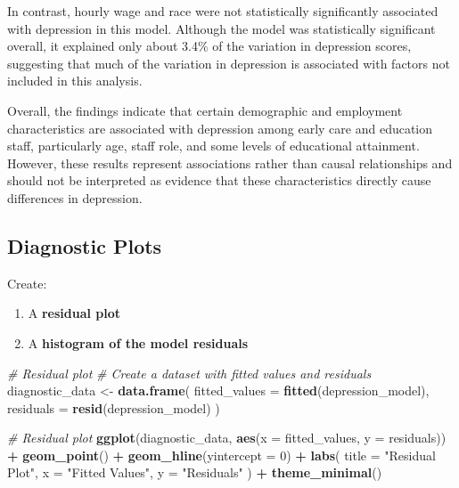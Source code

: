 \documentclass[
]{article}
\newenvironment{Shaded}{\begin{snugshade}}{\end{snugshade}}
\newcommand{\AttributeTok}[1]{\textcolor[rgb]{0.13,0.29,0.53}{#1}}
\newcommand{\CommentTok}[1]{\textcolor[rgb]{0.56,0.35,0.01}{\textit{#1}}}
\newcommand{\DecValTok}[1]{\textcolor[rgb]{0.00,0.00,0.81}{#1}}
\newcommand{\FunctionTok}[1]{\textcolor[rgb]{0.13,0.29,0.53}{\textbf{#1}}}
\newcommand{\NormalTok}[1]{#1}
\newcommand{\OtherTok}[1]{\textcolor[rgb]{0.56,0.35,0.01}{#1}}
\newcommand{\SpecialCharTok}[1]{\textcolor[rgb]{0.81,0.36,0.00}{\textbf{#1}}}
\newcommand{\StringTok}[1]{\textcolor[rgb]{0.31,0.60,0.02}{#1}}
\providecommand{\tightlist}{%
  \setlength{\itemsep}{0pt}\setlength{\parskip}{0pt}}
\begin{document}
In contrast, hourly wage and race were not statistically significantly
associated with depression in this model. Although the model was
statistically significant overall, it explained only about 3.4\% of the
variation in depression scores, suggesting that much of the variation in
depression is associated with factors not included in this analysis.

Overall, the findings indicate that certain demographic and employment
characteristics are associated with depression among early care and
education staff, particularly age, staff role, and some levels of
educational attainment. However, these results represent associations
rather than causal relationships and should not be interpreted as
evidence that these characteristics directly cause differences in
depression.

\newpage

\subsection{Diagnostic Plots}\label{diagnostic-plots}

Create:

\begin{enumerate}
\def\labelenumi{\arabic{enumi}.}
\tightlist
\item
  A \textbf{residual plot}
\item
  A \textbf{histogram of the model residuals}
\end{enumerate}

\begin{Shaded}
\begin{Highlighting}[]
\CommentTok{\# Residual plot}
\CommentTok{\# Create a dataset with fitted values and residuals}
\NormalTok{diagnostic\_data }\OtherTok{\textless{}{-}} \FunctionTok{data.frame}\NormalTok{(}
  \AttributeTok{fitted\_values =} \FunctionTok{fitted}\NormalTok{(depression\_model),}
  \AttributeTok{residuals =} \FunctionTok{resid}\NormalTok{(depression\_model)}
\NormalTok{)}

\CommentTok{\# Residual plot}
\FunctionTok{ggplot}\NormalTok{(diagnostic\_data,}
       \FunctionTok{aes}\NormalTok{(}\AttributeTok{x =}\NormalTok{ fitted\_values, }\AttributeTok{y =}\NormalTok{ residuals)) }\SpecialCharTok{+}
  \FunctionTok{geom\_point}\NormalTok{() }\SpecialCharTok{+}
  \FunctionTok{geom\_hline}\NormalTok{(}\AttributeTok{yintercept =} \DecValTok{0}\NormalTok{) }\SpecialCharTok{+}
  \FunctionTok{labs}\NormalTok{(}
    \AttributeTok{title =} \StringTok{"Residual Plot"}\NormalTok{,}
    \AttributeTok{x =} \StringTok{"Fitted Values"}\NormalTok{,}
    \AttributeTok{y =} \StringTok{"Residuals"}
\NormalTok{  ) }\SpecialCharTok{+}
  \FunctionTok{theme\_minimal}\NormalTok{()}
\end{Highlighting}
\end{Shaded}
\end{document}
